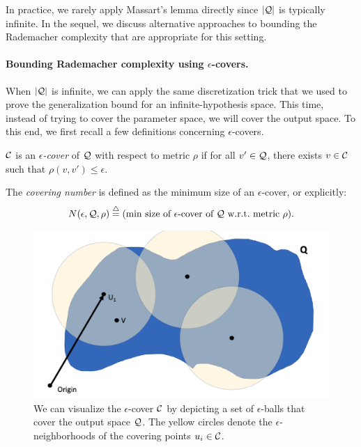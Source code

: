 In practice, we rarely apply Massart's lemma directly since $|\mathcal Q|$ is typically infinite. In the sequel, we discuss alternative approaches to bounding the Rademacher complexity that are appropriate for this setting.

\paragraph{Bounding Rademacher complexity using $\epsilon$-covers.}
When $|\mathcal Q|$ is infinite, we can apply the same discretization trick that we used to prove the generalization bound for an infinite-hypothesis space. This time, instead of trying to cover the parameter space, we will cover the output space. To this end, we first recall a few definitions concerning $\epsilon$-covers.

\begin{definition}
$\mathcal C$ is an \emph{$\epsilon$-cover} of $\mathcal Q$ with respect to metric $\rho$ if for all $v' \in \mathcal Q$, there exists $v \in \mathcal C $ such that $\rho(v,v')\le \epsilon$.
\end{definition}

\begin{definition}
The \emph{covering number} is defined as the minimum size of an $\epsilon$-cover, or explicitly:
\begin{align}
    N(\epsilon, \mathcal Q, \rho) \overset \triangle = (\text{min size of $\epsilon$-cover of $\mathcal Q$ w.r.t.\ metric $\rho$}).
\end{align}
\end{definition}

\begin{figure}[h]
	\begin{center}
		\includegraphics[width=.5\textwidth]{figures/chaining_1.png}
	\end{center}
	\caption{We can visualize the $\epsilon$-cover $\mathcal C$ by depicting a set of $\epsilon$-balls that cover the output space $\mathcal Q$. The yellow circles denote the $\epsilon$-neighborhoods of the covering points $u_i \in \mathcal C$.}
	\label{lec9:fig:eps-cover}
\end{figure}

